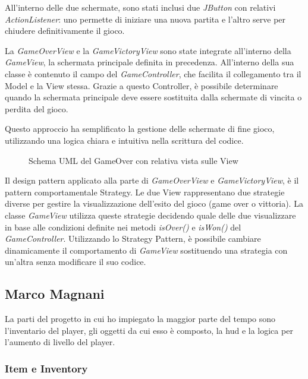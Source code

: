 \documentclass[a4paper,12pt]{report}
\begin{document}
All'interno delle due schermate, sono stati inclusi due \textit{JButton} con relativi \textit{ActionListener}: uno permette di iniziare una nuova partita e l'altro serve per chiudere definitivamente il gioco.

La \textit{GameOverView} e la \textit{GameVictoryView} sono state integrate all'interno della \textit{GameView}, la schermata principale definita in precedenza. All'interno della sua classe è contenuto il campo del \textit{GameController}, che facilita il collegamento tra il Model e la View stessa. Grazie a questo Controller, è possibile determinare quando la schermata principale deve essere sostituita dalla schermate di vincita o perdita del gioco.

Questo approccio ha semplificato la gestione delle schermate di fine gioco, utilizzando una logica chiara e intuitiva nella scrittura del codice.

\begin{figure}[H]
	\centering
	
	\caption{Schema UML del GameOver con relativa vista sulle View}
	\label{fig:the-exiled-victory_gameover-uml}
\end{figure}

Il design pattern applicato alla parte di \textit{GameOverView} e \textit{GameVictoryView}, è il pattern comportamentale Strategy. Le due View rappresentano due strategie diverse per gestire la visualizzazione dell'esito del gioco (game over o vittoria). La classe \textit{GameView} utilizza queste strategie decidendo quale delle due visualizzare in base alle condizioni definite nei metodi \textit{isOver()} e \textit{isWon()} del \textit{GameController}. Utilizzando lo Strategy Pattern, è possibile cambiare dinamicamente il comportamento di \textit{GameView} sostituendo una strategia con un'altra senza modificare il suo codice.

\subsection*{Marco Magnani}
La parti del progetto in cui ho impiegato la maggior parte del tempo sono l'inventario del player, gli oggetti da cui esso è composto, la hud e la logica per l'aumento di livello del player.

\subsubsection{Item e Inventory}
\end{document}
